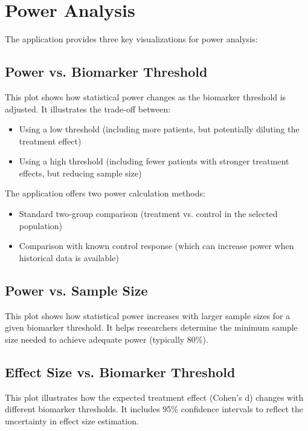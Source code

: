 \documentclass{article}
\begin{document}
\section{Power Analysis}

The application provides three key visualizations for power analysis:

\subsection{Power vs. Biomarker Threshold}

This plot shows how statistical power changes as the biomarker threshold is adjusted. It illustrates the trade-off between:

\begin{itemize}
    \item Using a low threshold (including more patients, but potentially diluting the treatment effect)
    \item Using a high threshold (including fewer patients with stronger treatment effects, but reducing sample size)
\end{itemize}

The application offers two power calculation methods:
\begin{itemize}
    \item Standard two-group comparison (treatment vs. control in the selected population)
    \item Comparison with known control response (which can increase power when historical data is available)
\end{itemize}

\subsection{Power vs. Sample Size}

This plot shows how statistical power increases with larger sample sizes for a given biomarker threshold. It helps researchers determine the minimum sample size needed to achieve adequate power (typically 80\%).

\subsection{Effect Size vs. Biomarker Threshold}

This plot illustrates how the expected treatment effect (Cohen's d) changes with different biomarker thresholds. It includes 95\% confidence intervals to reflect the uncertainty in effect size estimation.
\end{document}
